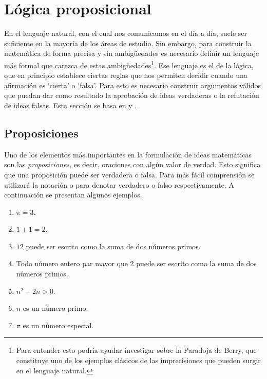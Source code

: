 \documentclass[12pt]{book}
\begin{document}
\section{Lógica proposicional}
\noindent
En el lenguaje natural, con el cual nos comunicamos en el día a día, suele ser suficiente en la mayoría de los áreas de estudio. Sin embargo, para construir la matemática de forma precisa y sin ambigüedades es necesario definir un lenguaje más formal que carezca de estas ambigüedades\footnote{Para entender esto podría ayudar investigar sobre la Paradoja de Berry, que constituye uno de los ejemplos clásicos de las imprecisiones que pueden surgir en el lenguaje natural.}. Ese lenguaje es el de la lógica, que en principio establece ciertas reglas que nos permiten decidir cuando una afirmación es `cierta' o `falsa'. Para esto es necesario construir argumentos válidos que puedan dar como resultado la aprobación de ideas verdaderas o la refutación de ideas falsas. Esta sección se basa en \cite[Part I, Chapter 1]{eccles2013introduction} y \cite[Part I, Chapter 2]{eccles2013introduction}.

\subsection{Proposiciones}\label{sec:proposiciones}
\noindent
Uno de los elementos más importantes en la formulación de ideas matemáticas son las \textit{proposiciones}, es decir, oraciones con algún valor de verdad. Esto significa que una proposición puede ser verdadera o falsa. Para más fácil comprensión se utilizará la notación \VV o \FF para denotar verdadero o falso respectivamente. A continuación se presentan algunos ejemplos. \\


\begin{center}
    \begin{minipage}{0.5\textwidth}
        \begin{enumerate}[label=(\roman*)]
            \item $\pi=3$.
            \item $1+1=2$.
            \item $12$ puede ser escrito como la suma de dos números primos.
            \item Todo número entero par mayor que 2 puede ser escrito como la suma de dos números primos.
            \item $n^2-2n>0$.
            \item $n$ es un número primo.
            \item $\pi$ es un número especial. \\
        \end{enumerate}
    \end{minipage}
\end{center}
\end{document}
